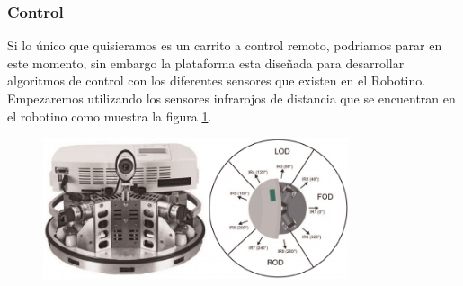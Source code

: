 \begin{frame}
	\frametitle{Control}
		Si lo único que quisieramos es un carrito a control remoto, podriamos parar en este momento, sin embargo la plataforma esta diseñada para desarrollar algoritmos de control con los diferentes sensores que existen en el Robotino. Empezaremos utilizando los sensores infrarojos de distancia que se encuentran en el robotino como muestra la figura \ref{fig:sensores}.
		\begin{figure}
			\begin{center}
				\includegraphics[width=0.8\textwidth]{images/ir-sensors.png}
				\label{fig:sensores}
			\end{center}
		\end{figure}
\end{frame}

